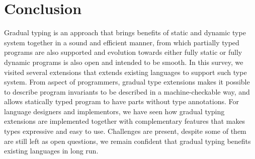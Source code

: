 \renewcommand{\thechapter}{5}
\section{Conclusion}

Gradual typing is an approach that brings benefits of static and dynamic type system
together in a sound and efficient manner, from which partially typed programs are also supported
and evolution towards either fully static or fully dynamic programs
is also open and intended to be smooth.
In this survey, we visited several extensions that extends existing languages to support such type system. From aspect of programmers, gradual type extensions makes it possible
to describe program invariants to be described in a machine-checkable way,
and allows statically typed program to have parts without type annotations.
For language designers and implementors, we have seen how gradual typing extensions are implemented
together with complementary features that makes types expressive and easy to use.
Challenges are present, despite some of them are still left as open questions,
we remain confident that gradual typing benefits existing languages in long run.





